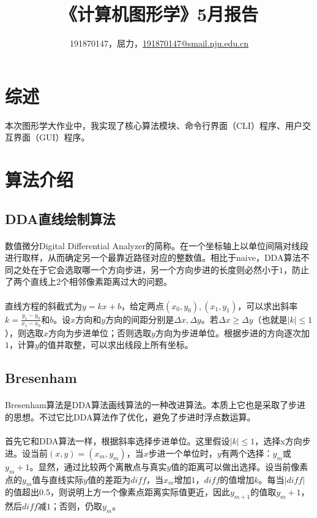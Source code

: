 \documentclass[a4paper,UTF8]{article}
\theoremstyle{definition}
\begin{document}
\title{\textbf{《计算机图形学》5月报告}}
\author{191870147，屈力，\href{mailto:xxx@xxx.com}{191870147@smail.nju.edu.cn}}
\maketitle

\section{综述}
本次图形学大作业中，我实现了核心算法模块、命令行界面（CLI）程序、用户交互界面（GUI）程序。
\section{算法介绍}
\subsection{DDA直线绘制算法}
\paragraph{}数值微分Digital Differential Analyzer的简称。在一个坐标轴上以单位间隔对线段进行取样，从而确定另一个最靠近路径对应的整数值。相比于naive，DDA算法不同之处在于它会选取哪一个方向步进，另一个方向步进的长度则必然小于$1$，防止了两个直线上$2$个相邻像素距离过大的问题。
\paragraph{}直线方程的斜截式为$y=kx+b$，给定两点$(x_0,y_0),(x_1,y_1)$，可以求出斜率$k=\frac{y_1-y_0}{x_1-x_0}$和$b$。设$x$方向和$y$方向的间距分别是$\Delta x,\Delta y$。若$\Delta x\ge \Delta y$（也就是$|k|\le 1$），则选取$x$方向为步进单位；否则选取$y$方向为步进单位。根据步进的方向逐次加$1$，计算$y$的值并取整，可以求出线段上所有坐标。
\subsection{Bresenham}
\paragraph{}Bresenham算法是DDA算法画线算法的一种改进算法。本质上它也是采取了步进的思想。不过它比DDA算法作了优化，避免了步进时浮点数运算。
\paragraph{}首先它和DDA算法一样，根据斜率选择步进单位。这里假设$|k|\le 1$，选择x方向步进。设当前$(x,y)=(x_m,y_m)$，当$x$步进一个单位时，$y$有两个选择：$y_m$或$y_{m}+1$。显然，通过比较两个离散点与真实$y$值的距离可以做出选择。设当前像素点的$y_m$值与直线实际$y$值的差距为$diff$，当$x_m$增加$1$，$diff$的值增加$k$。每当$|diff|$的值超出$0.5$，则说明上方一个像素点距离实际值更近，因此$y_{m+1}$的值取$y_m+1$，然后$diff$减$1$；否则，仍取$y_m$。
\end{document}
